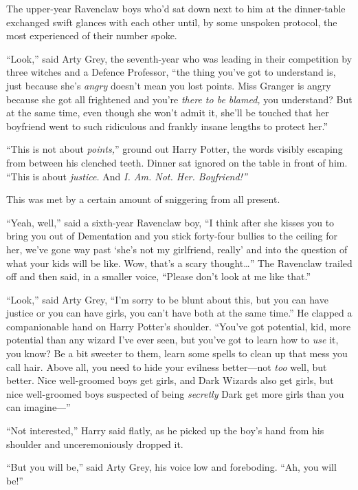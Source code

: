 The upper-year Ravenclaw boys who'd sat down next to him at the
dinner-table exchanged swift glances with each other until, by some
unspoken protocol, the most experienced of their number spoke.

``Look,'' said Arty Grey, the seventh-year who was leading in their
competition by three witches and a Defence Professor, ``the thing you've
got to understand is, just because she's \emph{angry} doesn't mean you
lost points. Miss Granger is angry because she got all frightened and
you're \emph{there to be blamed,} you understand? But at the same time,
even though she won't admit it, she'll be touched that her boyfriend
went to such ridiculous and frankly insane lengths to protect her.''

``This is not about \emph{points,}'' ground out Harry Potter, the words
visibly escaping from between his clenched teeth. Dinner sat ignored on
the table in front of him. ``This is about \emph{justice.} And \emph{I.
Am. Not. Her. Boyfriend!''}

This was met by a certain amount of sniggering from all present.

``Yeah, well,'' said a sixth-year Ravenclaw boy, ``I think after she
kisses you to bring you out of Dementation and you stick forty-four
bullies to the ceiling for her, we've gone way past `she's not my
girlfriend, really' and into the question of what your kids will be
like. Wow, that's a scary thought\ldots{}'' The Ravenclaw trailed off
and then said, in a smaller voice, ``Please don't look at me like
that.''

``Look,'' said Arty Grey, ``I'm sorry to be blunt about this, but you
can have justice or you can have girls, you can't have both at the same
time.'' He clapped a companionable hand on Harry Potter's shoulder.
``You've got potential, kid, more potential than any wizard I've ever
seen, but you've got to learn how to \emph{use} it, you know? Be a bit
sweeter to them, learn some spells to clean up that mess you call hair.
Above all, you need to hide your evilness better---not \emph{too} well,
but better. Nice well-groomed boys get girls, and Dark Wizards also get
girls, but nice well-groomed boys suspected of being \emph{secretly}
Dark get more girls than you can imagine---''

``Not interested,'' Harry said flatly, as he picked up the boy's hand
from his shoulder and unceremoniously dropped it.

``But you will be,'' said Arty Grey, his voice low and foreboding. ``Ah,
you will be!''

